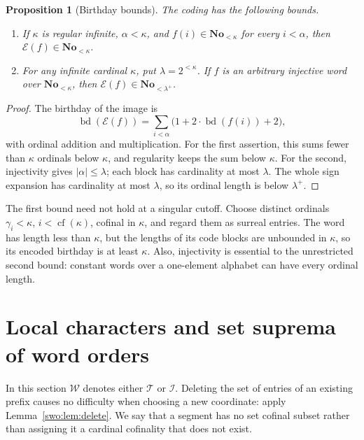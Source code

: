 \documentclass[11pt]{article}
\newtheorem{proposition}[proposition]{Proposition}
\theoremstyle{definition}
\theoremstyle{remark}
\newcommand{\No}{\mathbf{No}}
\newcommand{\Words}{\mathcal I}
\newcommand{\WordsAll}{\mathcal T}
\newcommand{\cf}{\operatorname{cf}}
\newcommand{\bd}{\operatorname{bd}}
\newcommand{\card}[1]{\lvert #1\rvert}
\begin{document}
\begin{proposition}[Birthday bounds]\label{swo:sw:codebounds}
The coding has the following bounds.
\begin{enumerate}
\item If \(\kappa\) is regular infinite, \(\alpha<\kappa\), and
      \(f(i)\in\No_{<\kappa}\) for every \(i<\alpha\), then
      \(\mathcal E(f)\in\No_{<\kappa}\).
\item For any infinite cardinal \(\kappa\), put
      \(\lambda=2^{<\kappa}\).  If \(f\) is an arbitrary
      injective word over \(\No_{<\kappa}\), then
      \(\mathcal E(f)\in\No_{<\lambda^+}\).
\end{enumerate}
\end{proposition}

\begin{proof}
The birthday of the image is
\[
       \bd(\mathcal E(f))
           =\sum_{i<\alpha}\bigl(1+2\cdot\bd(f(i))+2\bigr),
\]
with ordinal addition and multiplication.
For the first assertion, this sums fewer than \(\kappa\)
ordinals below \(\kappa\), and regularity keeps the sum
below \(\kappa\).
For the second, injectivity gives \(\card{\alpha}\leq\lambda\);
each block has cardinality at most \(\lambda\).
The whole sign expansion has cardinality at most \(\lambda\),
so its ordinal length is below \(\lambda^+\).
\end{proof}

The first bound need not hold at a singular cutoff.
Choose distinct ordinals \(\gamma_i<\kappa\),
\(i<\cf(\kappa)\), cofinal in \(\kappa\), and regard them as
surreal entries.  The word has length less than \(\kappa\),
but the lengths of its code blocks are unbounded in \(\kappa\),
so its encoded birthday is at least \(\kappa\).
Also, injectivity is essential to the unrestricted second bound:
constant words over a one-element alphabet can have every
ordinal length.

\section{Local characters and set suprema of word orders}
\label{swo:sw:characters}

In this section \(\mathcal W\) denotes either \(\WordsAll\)
or \(\Words\).
Deleting the set of entries of an existing prefix causes no
difficulty when choosing a new coordinate: apply
Lemma~\ref{swo:lem:delete}.
We say that a segment has no set cofinal subset rather than
assigning it a cardinal cofinality that does not exist.
\end{document}
